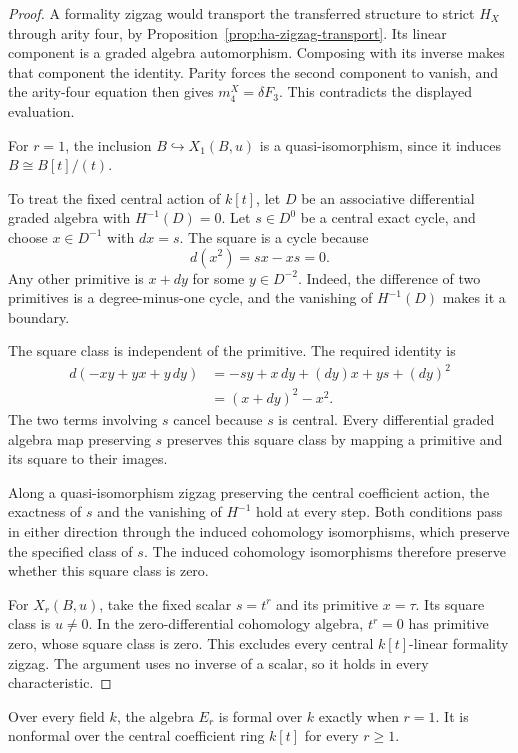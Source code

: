 \begin{proof}
A formality zigzag would transport the transferred structure to
strict $H_X$ through arity four, by
Proposition~\ref{prop:ha-zigzag-transport}.
Its linear component is a graded algebra automorphism.
Composing with its inverse makes that component the identity.
Parity forces the second component to vanish, and the arity-four
equation then gives $m_4^X=\delta F_3$.
This contradicts the displayed evaluation.

For $r=1$, the inclusion $B\hookrightarrow X_1(B,u)$ is a
quasi-isomorphism, since it induces $B\cong B[t]/(t)$.

To treat the fixed central action of $k[t]$, let $D$ be an associative
differential graded algebra with $H^{-1}(D)=0$.
Let $s\in D^0$ be a central exact cycle, and choose $x\in D^{-1}$
with $dx=s$. The square is a cycle because
\[
 d(x^2)=sx-xs=0.
\]
Any other primitive is $x+dy$ for some $y\in D^{-2}$.
Indeed, the difference of two primitives is a degree-minus-one cycle,
and the vanishing of $H^{-1}(D)$ makes it a boundary.

The square class is independent of the primitive.
The required identity is
\[
 \begin{split}
 d(-xy+yx+y\,dy)
 &=-sy+x\,dy+(dy)x+ys+(dy)^2\\
 &=(x+dy)^2-x^2.
 \end{split}
\]
The two terms involving $s$ cancel because $s$ is central.
Every differential graded algebra map preserving $s$ preserves this
square class by mapping a primitive and its square to their images.

Along a quasi-isomorphism zigzag preserving the central coefficient
action, the exactness of $s$ and the vanishing of $H^{-1}$ hold at every step.
Both conditions pass in either direction through the induced cohomology
isomorphisms, which preserve the specified class of $s$.
The induced cohomology isomorphisms therefore preserve whether this
square class is zero.

For $X_r(B,u)$, take the fixed scalar $s=t^r$ and its primitive
$x=\tau$. Its square class is $u\ne0$.
In the zero-differential cohomology algebra, $t^r=0$ has primitive zero,
whose square class is zero.
This excludes every central $k[t]$-linear formality zigzag.
The argument uses no inverse of a scalar, so it holds in every characteristic.
\end{proof}

\begin{corollary}\label{prop:ha-witness-k-formality}
Over every field $k$, the algebra $E_r$ is formal over $k$ exactly
when $r=1$. It is nonformal over the central coefficient ring $k[t]$
for every $r\geq1$.
\end{corollary}

